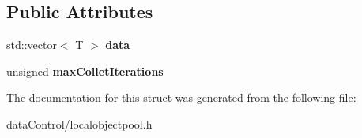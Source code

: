 \subsection*{Public Attributes}
\begin{DoxyCompactItemize}
\item 
\hypertarget{struct_tempest_1_1_local_object_pool_a48f43366a7dc644e143cc421200dff65}{std\+::vector$<$ T $>$ {\bfseries data}}\label{struct_tempest_1_1_local_object_pool_a48f43366a7dc644e143cc421200dff65}

\item 
\hypertarget{struct_tempest_1_1_local_object_pool_a18031e65d9cc5c8dcd8a99ca169b8c04}{unsigned {\bfseries max\+Collet\+Iterations}}\label{struct_tempest_1_1_local_object_pool_a18031e65d9cc5c8dcd8a99ca169b8c04}

\end{DoxyCompactItemize}


The documentation for this struct was generated from the following file\+:\begin{DoxyCompactItemize}
\item 
data\+Control/localobjectpool.\+h\end{DoxyCompactItemize}
